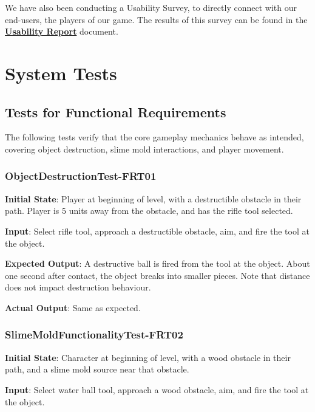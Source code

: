 \documentclass[12pt, titlepage]{article}
\begin{document}
We have also been conducting a Usability Survey, to directly connect with our
end-users, the players of our game. The results of this survey can be found
in the \href{https://github.com/felix-hurst/Ad-Natura/blob/main/docs/Extras/UsabilityReport/UsabilityReport.pdf}{\bf{Usability Report}} document.



\section{System Tests}\label{systemtests}

\subsection{Tests for Functional Requirements}

The following tests verify that the core gameplay mechanics behave as intended, covering object destruction, slime mold interactions, and player movement.

\subsubsection{ObjectDestructionTest-FRT01}


\textbf{Initial State}: Player at beginning of level, with a destructible
obstacle in their path. Player is 5 units away from the obstacle, and has the rifle tool selected.

\textbf{Input}: Select rifle tool, approach a destructible obstacle, aim,
and fire the tool at the object.

\textbf{Expected Output}: A destructive ball is fired from the tool at the object.
About one second after contact, the object breaks into smaller pieces. Note that distance does not impact destruction behaviour.

\textbf{Actual Output}: Same as expected.



\subsubsection{SlimeMoldFunctionalityTest-FRT02}

\textbf{Initial State}: Character at beginning of level, with a wood obstacle
in their path, and a slime mold source near that obstacle.

\textbf{Input}: Select water ball tool, approach a wood obstacle, aim,
and fire the tool at the object.
\end{document}

